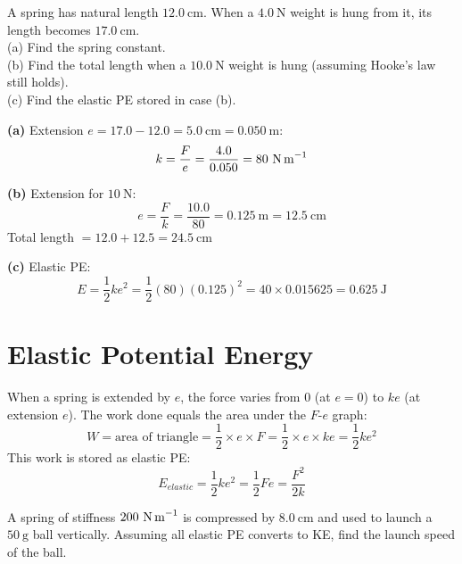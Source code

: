 \begin{examplebox}[9.1]
A spring has natural length $12.0\ \text{cm}$.
When a $4.0\ \text{N}$ weight is hung from it, its
length becomes $17.0\ \text{cm}$.\\
(a) Find the spring constant.\\
(b) Find the total length when a $10.0\ \text{N}$
weight is hung (assuming Hooke's law still holds).\\
(c) Find the elastic PE stored in case (b).
\end{examplebox}

\begin{solutionbox}
\textbf{(a)} Extension $e = 17.0 - 12.0 = 5.0\ \text{cm}
= 0.050\ \text{m}$:
\[
  k = \frac{F}{e} = \frac{4.0}{0.050}
  = 80\ \text{N\,m}^{-1}
\]

\textbf{(b)} Extension for $10\ \text{N}$:
\[
  e = \frac{F}{k} = \frac{10.0}{80} = 0.125\ \text{m}
  = 12.5\ \text{cm}
\]
Total length $= 12.0 + 12.5 = 24.5\ \text{cm}$

\textbf{(c)} Elastic PE:
\[
  E = \frac{1}{2}ke^2
  = \frac{1}{2}(80)(0.125)^2
  = 40 \times 0.015625
  = 0.625\ \text{J}
\]
\end{solutionbox}

\section{Elastic Potential Energy}

\begin{processbox}
When a spring is extended by $e$, the force varies
from $0$ (at $e=0$) to $ke$ (at extension $e$).
The work done equals the area under the $F$-$e$ graph:
\[
  W = \text{area of triangle}
  = \frac{1}{2} \times e \times F
  = \frac{1}{2} \times e \times ke
  = \frac{1}{2}ke^2
\]
This work is stored as elastic PE:
\[
  \boxed{E_{elastic} = \frac{1}{2}ke^2
  = \frac{1}{2}Fe = \frac{F^2}{2k}}
\]
\end{processbox}

\begin{examplebox}[9.2]
A spring of stiffness $200\ \text{N\,m}^{-1}$ is
compressed by $8.0\ \text{cm}$ and used to launch
a $50\ \text{g}$ ball vertically. Assuming all
elastic PE converts to KE, find the launch speed
of the ball.
\end{examplebox}

